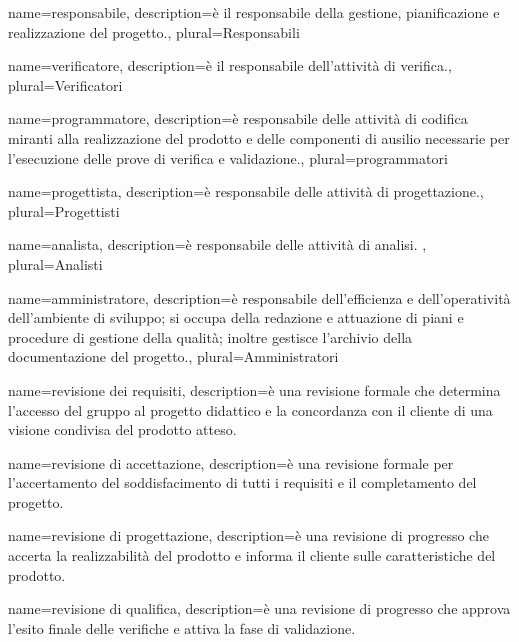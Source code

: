 \makeglossary

 {
	name=responsabile,
	description={è il responsabile della gestione, pianificazione e realizzazione del progetto.},
	plural=Responsabili
}

 {
	name=verificatore,
	description={è il responsabile dell'attività di verifica.},
	plural=Verificatori
}

 {
	name=programmatore,
	description={è responsabile delle attività di codifica miranti alla realizzazione del prodotto e delle componenti di ausilio necessarie per l'esecuzione delle prove di verifica e validazione.},
	plural=programmatori
}

 {
	name=progettista,
	description={è responsabile delle attività di progettazione.},
	plural=Progettisti
}

 {
	name=analista,
	description={è responsabile delle attività di analisi. },
	plural=Analisti
}

 {
	name=amministratore,
	description={è responsabile dell'efficienza e dell'operatività dell'ambiente di sviluppo; si occupa della redazione e attuazione di piani e procedure di gestione della qualità; inoltre gestisce l'archivio della documentazione del progetto.},
	plural=Amministratori
}

 {
	name=revisione dei requisiti,
	description={è una revisione formale che determina l'accesso del gruppo al progetto didattico e la concordanza con il cliente di una visione condivisa del prodotto atteso.}
}

 {
	name=revisione di accettazione,
	description={è una revisione formale per l'accertamento del soddisfacimento di tutti i requisiti e il completamento del progetto.}
}

 {
	name=revisione di progettazione,
	description={è una revisione di progresso che accerta la realizzabilità del prodotto e informa il cliente sulle caratteristiche del prodotto.}
}

 {
	name=revisione di qualifica,
	description={è una revisione di progresso che approva l'esito finale delle verifiche e attiva la fase di validazione.}
}

